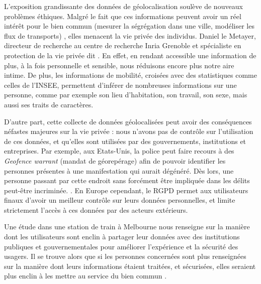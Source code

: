 \documentclass[runningheads]{llncs}
\begin{document}
L'exposition grandissante des données de géolocalisation soulève de nouveaux problèmes éthiques. Malgré le fait que ces informations peuvent avoir un réel intérêt pour le bien commun (mesurer la ségrégation dans une ville, modéliser les flux de transports)  \cite{calacci_tradeoff_2019}, elles menacent la vie privée des individus. Daniel le Metayer, directeur de recherche au centre de recherche Inria Grenoble et spécialiste en protection de la vie privée dit . En effet, en rendant accessible une information de plus, à la fois personnelle et sensible, nous réduisons encore plus notre aire intime. De plus, les informations de mobilité, croisées avec des statistiques comme celles de l'INSEE, permettent d'inférer de nombreuses informations sur une personne, comme par exemple son lieu d'habitation, son travail, son sexe, mais aussi ses traits de caractères. \cite{boutet_inspect_2019}

D'autre part, cette collecte de données géolocalisées peut avoir des conséquences néfastes majeures sur la vie privée : nous n'avons pas de contrôle sur l'utilisation de ces données, et qu'elles sont utilisées par des gouvernements, institutions et entreprises. Par exemple, aux Etats-Unis, la police peut faire recours à des \textit{Geofence warrant} (mandat de géorepérage) afin de pouvoir identifier les personnes présentes à une manifestation qui aurait dégénéré. Dès lors, une personne passant par cette endroit sans forcément être impliquée dans les délits peut-être incriminée. \cite{chatrie_united_2019}. En Europe cependant, le RGPD permet aux utilisateurs finaux d'avoir un meilleur contrôle sur leurs données personnelles, et limite strictement l'accès à ces données par des acteurs extérieurs.

Une étude dans une station de train à Melbourne nous renseigne sur la manière dont les utilisateurs sont enclin à partager leur données avec des institutions publiques et gouvernementales pour améliorer l'expérience et la sécurité des usagers. Il se trouve alors que  si les personnes concernées sont plus renseignées sur la manière dont leurs informations étaient traitées, et sécurisées, elles seraient plus enclin à les mettre au service du bien commun \cite{cabalquinto_it_2020}.
\end{document}
